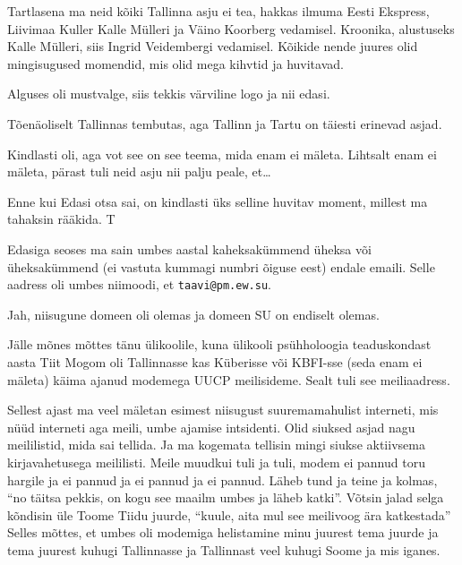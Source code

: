 Tartlasena ma neid kõiki Tallinna asju ei tea, hakkas ilmuma Eesti Ekspress, Liivimaa Kuller Kalle Mülleri ja Väino Koorberg vedamisel. Kroonika, alustuseks Kalle Mülleri, siis Ingrid Veidembergi vedamisel. Kõikide nende juures olid mingisugused momendid, mis olid mega kihvtid ja huvitavad. 

Alguses oli mustvalge, siis tekkis värviline logo ja nii edasi.


Tõenäoliselt Tallinnas tembutas, aga Tallinn ja Tartu on täiesti erinevad asjad.


Kindlasti oli, aga vot see on see teema, mida enam ei mäleta. Lihtsalt enam ei mäleta, pärast tuli neid asju nii palju peale, et\ldots


Enne kui Edasi otsa sai, on kindlasti üks selline huvitav moment, millest ma tahaksin rääkida. T

Edasiga seoses ma sain umbes aastal kaheksakümmend üheksa või üheksakümmend (ei vastuta kummagi numbri õiguse eest) endale emaili. Selle aadress oli umbes niimoodi, et \verb|taavi@pm.ew.su|.


Jah, niisugune domeen oli olemas ja domeen SU on endiselt olemas.


Jälle mõnes mõttes tänu ülikoolile, kuna ülikooli psühholoogia teaduskondast aasta Tiit Mogom oli Tallinnasse kas Küberisse või KBFI-sse (seda enam ei mäleta) käima ajanud  modemega UUCP meilisideme. Sealt tuli see meiliaadress. 

Sellest ajast ma veel mäletan esimest niisugust suuremamahulist interneti, mis nüüd interneti aga meili, umbe ajamise intsidenti. Olid siuksed asjad nagu meililistid, mida sai tellida. Ja ma kogemata tellisin mingi siukse aktiivsema kirjavahetusega meililisti. Meile muudkui tuli ja tuli, modem ei pannud toru hargile ja ei pannud ja ei pannud ja ei pannud. Läheb tund ja teine ja kolmas, \enquote{no täitsa pekkis, on kogu see maailm umbes ja läheb katki}.  Võtsin jalad selga kõndisin üle Toome Tiidu juurde, \enquote{kuule, aita mul see meilivoog ära katkestada} Selles mõttes, et umbes oli modemiga helistamine minu juurest tema juurde ja tema juurest kuhugi Tallinnasse ja Tallinnast veel kuhugi Soome ja mis iganes.

